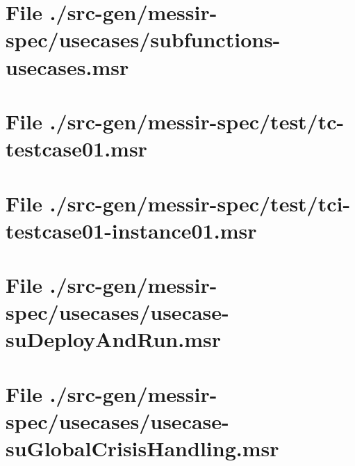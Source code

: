 \section[File /src-gen/messir-spec/usecases/subfunctions-usecases.msr]{File ./src-gen/messir-spec/usecases/subfunctions-usecases.msr}
\scriptsize

\normalsize
	
\section[File /src-gen/messir-spec/test/tc-testcase01.msr]{File ./src-gen/messir-spec/test/tc-testcase01.msr}
\scriptsize

\normalsize
	
\section[File /src-gen/messir-spec/test/tci-testcase01-instance01.msr]{File ./src-gen/messir-spec/test/tci-testcase01-instance01.msr}
\scriptsize

\normalsize
	
\section[File /src-gen/messir-spec/usecases/usecase-suDeployAndRun.msr]{File ./src-gen/messir-spec/usecases/usecase-suDeployAndRun.msr}
\scriptsize

\normalsize
	
\section[File /src-gen/messir-spec/usecases/usecase-suGlobalCrisisHandling.msr]{File ./src-gen/messir-spec/usecases/usecase-suGlobalCrisisHandling.msr}
\scriptsize

\normalsize
	
